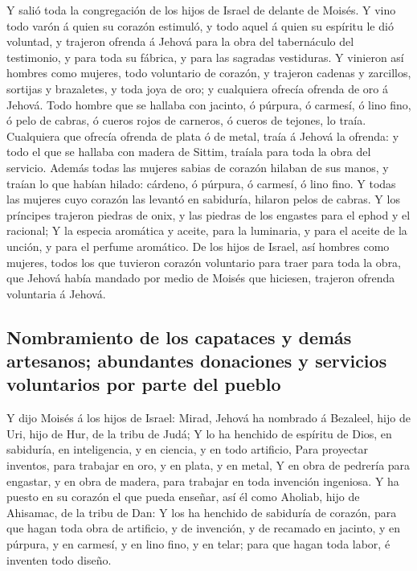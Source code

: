  Y salió toda la congregación de los hijos de Israel de
delante de Moisés.  Y vino todo varón á quien su corazón
estimuló, y todo aquel á quien su espíritu le dió voluntad, y trajeron
ofrenda á Jehová para la obra del tabernáculo del testimonio, y para
toda su fábrica, y para las sagradas vestiduras.  Y
vinieron así hombres como mujeres, todo voluntario de corazón, y
trajeron cadenas y zarcillos, sortijas y brazaletes, y toda joya de oro;
y cualquiera ofrecía ofrenda de oro á Jehová.  Todo hombre
que se hallaba con jacinto, ó púrpura, ó carmesí, ó lino fino, ó pelo de
cabras, ó cueros rojos de carneros, ó cueros de tejones, lo traía.
 Cualquiera que ofrecía ofrenda de plata ó de metal, traía
á Jehová la ofrenda: y todo el que se hallaba con madera de Sittim,
traíala para toda la obra del servicio.  Además todas las
mujeres sabias de corazón hilaban de sus manos, y traían lo que habían
hilado: cárdeno, ó púrpura, ó carmesí, ó lino fino.  Y
todas las mujeres cuyo corazón las levantó en sabiduría, hilaron pelos
de cabras.  Y los príncipes trajeron piedras de onix, y las
piedras de los engastes para el ephod y el racional;  Y la
especia aromática y aceite, para la luminaria, y para el aceite de la
unción, y para el perfume aromático.  De los hijos de
Israel, así hombres como mujeres, todos los que tuvieron corazón
voluntario para traer para toda la obra, que Jehová había mandado por
medio de Moisés que hiciesen, trajeron ofrenda voluntaria á Jehová.

\hypertarget{nombramiento-de-los-capataces-y-demuxe1s-artesanos-abundantes-donaciones-y-servicios-voluntarios-por-parte-del-pueblo}{%
\subsection{Nombramiento de los capataces y demás artesanos; abundantes
donaciones y servicios voluntarios por parte del
pueblo}\label{nombramiento-de-los-capataces-y-demuxe1s-artesanos-abundantes-donaciones-y-servicios-voluntarios-por-parte-del-pueblo}}

 Y dijo Moisés á los hijos de Israel: Mirad, Jehová ha
nombrado á Bezaleel, hijo de Uri, hijo de Hur, de la tribu de Judá;
 Y lo ha henchido de espíritu de Dios, en sabiduría, en
inteligencia, y en ciencia, y en todo artificio,  Para
proyectar inventos, para trabajar en oro, y en plata, y en metal,
 Y en obra de pedrería para engastar, y en obra de madera,
para trabajar en toda invención ingeniosa.  Y ha puesto en
su corazón el que pueda enseñar, así él como Aholiab, hijo de Ahisamac,
de la tribu de Dan:  Y los ha henchido de sabiduría de
corazón, para que hagan toda obra de artificio, y de invención, y de
recamado en jacinto, y en púrpura, y en carmesí, y en lino fino, y en
telar; para que hagan toda labor, é inventen todo diseño.

